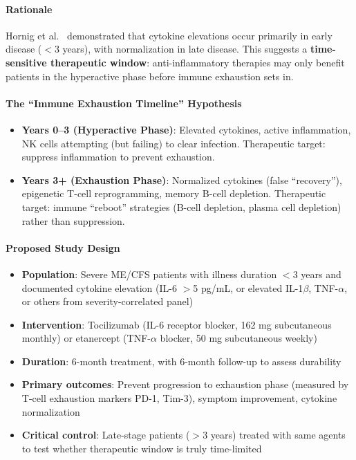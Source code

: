 \paragraph{Rationale}
Hornig et al.~\cite{Hornig2015} demonstrated that cytokine elevations occur primarily in early disease ($<$3 years), with normalization in late disease. This suggests a \textbf{time-sensitive therapeutic window}: anti-inflammatory therapies may only benefit patients in the hyperactive phase before immune exhaustion sets in.

\paragraph{The ``Immune Exhaustion Timeline'' Hypothesis}
\begin{itemize}
    \item \textbf{Years 0--3 (Hyperactive Phase)}: Elevated cytokines, active inflammation, NK cells attempting (but failing) to clear infection. Therapeutic target: suppress inflammation to prevent exhaustion.
    \item \textbf{Years 3+ (Exhaustion Phase)}: Normalized cytokines (false ``recovery''), epigenetic T-cell reprogramming, memory B-cell depletion. Therapeutic target: immune ``reboot'' strategies (B-cell depletion, plasma cell depletion) rather than suppression.
\end{itemize}

\paragraph{Proposed Study Design}
\begin{itemize}
    \item \textbf{Population}: Severe ME/CFS patients with illness duration $<$3 years and documented cytokine elevation (IL-6 $>$5 pg/mL, or elevated IL-1$\beta$, TNF-$\alpha$, or others from severity-correlated panel)
    \item \textbf{Intervention}: Tocilizumab (IL-6 receptor blocker, 162 mg subcutaneous monthly) or etanercept (TNF-$\alpha$ blocker, 50 mg subcutaneous weekly)
    \item \textbf{Duration}: 6-month treatment, with 6-month follow-up to assess durability
    \item \textbf{Primary outcomes}: Prevent progression to exhaustion phase (measured by T-cell exhaustion markers PD-1, Tim-3), symptom improvement, cytokine normalization
    \item \textbf{Critical control}: Late-stage patients ($>$3 years) treated with same agents to test whether therapeutic window is truly time-limited
\end{itemize}

